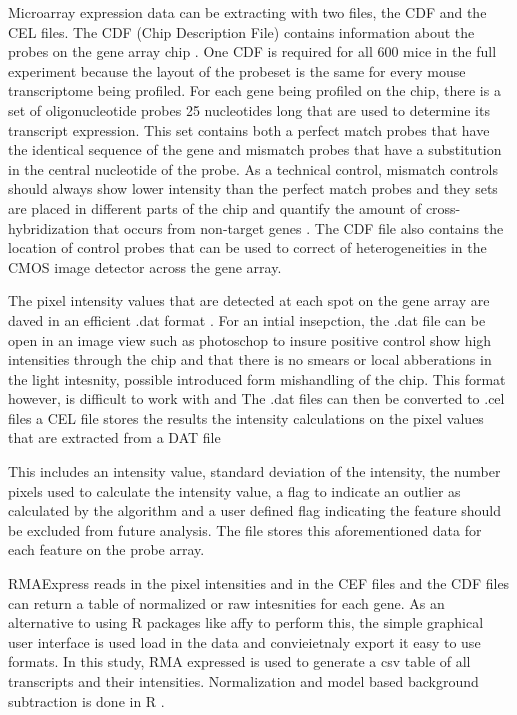 \documentclass[a4paper,11pt,twoside]{book}
\begin{document}
	Microarray expression data can be extracting with two files, the CDF and the CEL files. The CDF (Chip Description File) contains information about the probes on the gene array chip \citep{BenBolstad2003}. One CDF is required for all 600 mice in the full experiment because the layout of the probeset is the same for every mouse transcriptome being profiled. For each gene being profiled on the chip, there is a set of oligonucleotide probes 25 nucleotides long that are used to determine its transcript expression. This set contains both a perfect match probes that have the identical sequence of the gene and mismatch probes that have a substitution in the central nucleotide of the probe. As a technical control, mismatch controls should always show lower intensity than the perfect match probes and they sets are placed in different parts of the chip and quantify the amount of cross-hybridization that occurs from non-target genes  \citep{Coen2010}. The CDF file also contains the location of control probes that can be used to correct of heterogeneities in the CMOS image detector across the gene array.   
	
	The pixel intensity values that are detected at each spot on the gene array are daved in an efficient .dat format \citep{Miller2009MicroArrays}. For an intial insepction, the .dat file can be open in an image view such as photoschop to insure positive control show high intensities through the chip and that there is no smears or local abberations in the light intesnity, possible introduced form mishandling of the chip. This format however, is difficult to work with and 	The .dat files can then be converted to .cel files
	 a CEL file stores the results the intensity calculations on the pixel values that are extracted from a DAT file

	
	 This includes an intensity value, standard deviation of the intensity, the number pixels used to calculate the intensity value, a flag to indicate an outlier as calculated by the algorithm and a user defined flag indicating the feature should be excluded from future analysis\citep{Miller2009MicroArrays}. The file stores this aforementioned data for each feature on the probe array. 
	
	RMAExpress reads in the pixel intensities and in the CEF files and the CDF files can return a table of normalized or raw intesnities for each gene. As an alternative to using R packages like affy to perform this, the simple graphical user interface is used load in the data and convieietnaly export it easy to use formats. In this study, RMA expressed is used to generate a csv table of all transcripts and their intensities. Normalization and model based background subtraction is done in R \citep{Irizarry2003,Irizarry2003a,Bolstad2003}.
	
\end{document}
